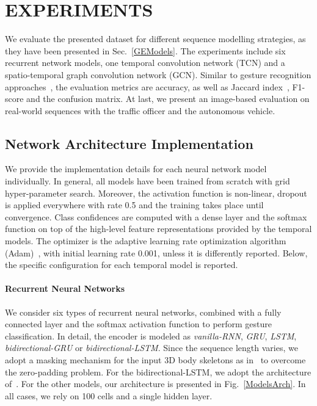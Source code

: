 \documentclass[letterpaper, 10 pt, conference]{ieeeconf}
\begin{document}
\section{EXPERIMENTS}

We evaluate the presented dataset for different sequence modelling strategies, as they have been presented in Sec.~\ref{GEModels}. The experiments include six recurrent network models, one temporal convolution network (TCN) and a spatio-temporal graph convolution network (GCN). Similar to gesture recognition approaches~\cite{Shahroudy2016NTUAnalysis}, the evaluation metrics are accuracy, as well as Jaccard index~\cite{Escalera2015ChalearnResults}, F1-score and the confusion matrix. At last, we present an image-based evaluation on real-world sequences with the traffic officer and the autonomous vehicle.

\subsection{Network Architecture Implementation}

We provide the implementation details for each neural network model individually. In general, all models have been trained from scratch with grid hyper-parameter search. Moreover, the activation function is non-linear, dropout is applied everywhere with rate 0.5 and the training takes place until convergence. Class confidences are computed with a dense layer and the softmax function on top of the high-level feature representations provided by the temporal models. The optimizer is the adaptive learning rate optimization algorithm (Adam)~\cite{kingma2014method}, with initial learning rate 0.001, unless it is differently reported. Below, the specific configuration for each temporal model is reported.

\paragraph{Recurrent Neural Networks}

We consider six types of recurrent neural networks, combined with a fully connected layer and the softmax activation function to perform gesture classification. In detail, the encoder is modeled as \emph{vanilla-RNN}, \emph{GRU}, \emph{LSTM}, \emph{bidirectional-GRU} or \emph{bidirectional-LSTM}. Since the sequence length varies, we adopt a masking mechanism for the input 3D body skeletons as in~\cite{Zou2019DeepBiLSTMRecognition} to overcome the zero-padding problem. For the bidirectional-LSTM, we adopt the architecture of~\cite{Zou2019DeepBiLSTMRecognition}. For the other models, our architecture is presented in Fig.~\ref{ModelsArch}. In all cases, we rely on 100 cells and a single hidden layer.
\end{document}
